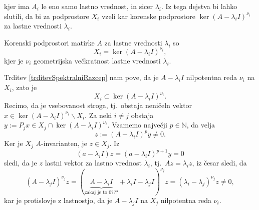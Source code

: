 \documentclass[mat1]{fmfdelo}
\newcommand{\N}{\mathbb N}
\begin{document}
kjer ima $A_i$ le eno samo lastno vrednost, in sicer $\lambda_i$. Iz tega dejstva bi lahko slutili, da bi za podprostore $X_i$ vzeli kar korenske podprostore $\ker (A - \lambda_i I)^{\nu_i}$ za lastne vrednosti $\lambda_i$.
\begin{trditev}
    Korenski podprostori matirke $A$ za lastne vrednosti $\lambda_i$ so
    \begin{equation*}
        X_i = \ker (A - \lambda_i I)^{\nu_i},
    \end{equation*}
    kjer je $\nu_i$ geometrijska večkratnost lastne vrednosti $\lambda_i$.
\end{trditev}
\begin{dokaz}
    Trditev \ref{trditevSpektralniRazcep} nam pove, da je $A - \lambda_i I$ nilpotentna reda $\nu_i$ na $X_i$, zato je
    \begin{equation} \label{strogaVsebovanost}
        X_i \subset \ker (A - \lambda_i I)^{\nu_i}.
    \end{equation}
    Recimo, da je vsebovanost stroga, tj.\ obstaja neničeln vektor $x \in \ker (A - \lambda_i I)^{\nu_i} \backslash X_i$. Za neki $i \neq j$ obstaja $y := P_j x \in X_j \cap \ker (A - \lambda_i I)^{\nu_i}$. Vzamemo največji $p \in \N$, da velja
    \begin{equation*}
        z := (A - \lambda_i I)^p y \neq 0.
    \end{equation*}
    Ker je $X_j$ $A$-invarianten, je $z \in X_j$. Iz
    \begin{equation*}
        (a - \lambda_i I) z = (a - \lambda_i I)^{p+1} y = 0
    \end{equation*}
    sledi, da je $z$ lastni vektor za lastno vrednost $\lambda_i$, tj.\ $A z = \lambda_i z$, iz česar sledi, da
    \begin{equation*}
        (A - \lambda_j I)^{\nu_j} z = ( \underbrace{A - \lambda_i I}_\text{zakaj je to 0???} + \lambda_i I - \lambda_j I)^{\nu_j} z = (\lambda_i - \lambda_j)^{\nu_j} z \neq 0,
    \end{equation*}
    kar je protislovje z lastnostjo, da je $A - \lambda_j I$ na $X_j$ nilpotentna reda $\nu_i$.
\end{dokaz}
\end{document}
